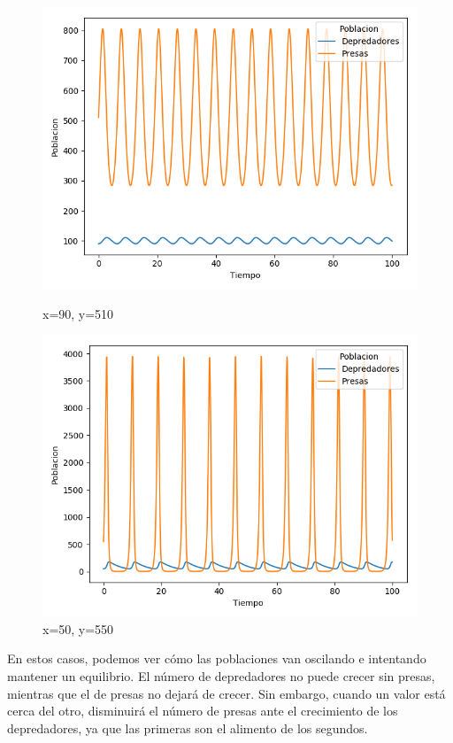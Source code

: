 \documentclass[11pt,a4paper]{article}
\begin{document}
\begin{figure}[H]
	\centering
	\begin{minipage}{0.5\textwidth}
	  \centering
	  \includegraphics[scale=0.4]{img/2-90-510.png}
	  \caption{x=90,  y=510}
	\end{minipage}%
	\begin{minipage}{0.5\textwidth}
	  \centering
	  \includegraphics[scale=0.4]{img/2-50-550.png}
	  \caption{x=50,  y=550}
	\end{minipage}
\end{figure}

En estos casos, podemos ver cómo las poblaciones van oscilando e intentando mantener un equilibrio. El número de depredadores no puede crecer
sin presas, mientras que el de presas no dejará de crecer. Sin embargo, cuando un valor está cerca del otro, disminuirá el número de presas
ante el crecimiento de los depredadores, ya que las primeras son el alimento de los segundos.
\end{document}
